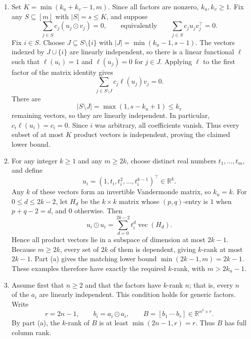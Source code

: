 \documentclass[12pt]{article}
\theoremstyle{plain}
\theoremstyle{definition}
\begin{document}
\newline 
\begin{enumerate}
    \item[(a)] Set \(K=\min(k_u+k_v-1,m)\). Since all factors are
    nonzero, \(k_u,k_v\geq1\). Fix any \(S\subseteq[m]\) with
    \(|S|=s\leq K\), and suppose
    \[
    \sum_{j\in S}c_j(u_j\odot v_j)=0,
    \qquad\text{equivalently}\qquad
    \sum_{j\in S}c_j u_jv_j^\top=0.
    \]
    Fix \(i\in S\). Choose \(J\subseteq S\setminus\{i\}\) with
    \(|J|=\min(k_u-1,s-1)\). The vectors indexed by
    \(J\cup\{i\}\) are linearly independent, so there is a linear
    functional \(\ell\) such that
    \(\ell(u_i)=1\) and \(\ell(u_j)=0\) for \(j\in J\).
    Applying \(\ell\) to the first factor of the matrix identity gives
    \[
    \sum_{j\in S\setminus J}c_j\ell(u_j)v_j=0.
    \]
    There are
    \[
    |S\setminus J|=\max(1,s-k_u+1)\leq k_v
    \]
    remaining vectors, so they are linearly independent. In particular,
    \(c_i\ell(u_i)=c_i=0\). Since \(i\) was arbitrary, all coefficients
    vanish. Thus every subset of at most \(K\) product vectors is
    independent, proving the claimed lower bound.

    \item[(b)] For any integer \(k\geq1\) and any \(m\geq2k\), choose
    distinct real numbers \(t_1,\ldots,t_m\), and define
    \[
    u_i=(1,t_i,t_i^2,\ldots,t_i^{k-1})^\top\in\mathbb R^k.
    \]
    Any \(k\) of these vectors form an invertible Vandermonde matrix,
    so \(k_u=k\). For \(0\leq d\leq2k-2\), let \(H_d\) be the
    \(k\times k\) matrix whose \((p,q)\)-entry is \(1\) when
    \(p+q-2=d\), and \(0\) otherwise. Then
    \[
    u_i\odot u_i
    =\sum_{d=0}^{2k-2}t_i^d\operatorname{vec}(H_d).
    \]
    Hence all product vectors lie in a subspace of dimension at most
    \(2k-1\). Because \(m\geq2k\), every set of \(2k\) of them is
    dependent, giving \(k\)-rank at most \(2k-1\). Part (a) gives the
    matching lower bound \(\min(2k-1,m)=2k-1\). These examples therefore
    have exactly the required \(k\)-rank, with \(m>2k_u-1\).

    \item[(c)] Assume first that \(n\geq2\) and that the factors have
    \(k\)-rank \(n\); that is, every \(n\) of the \(a_i\) are
    linearly independent. This condition holds for generic factors.
    Write
    \[
    r=2n-1,\qquad b_i=a_i\odot a_i,\qquad
    B=[b_1\ \cdots\ b_r]\in\mathbb R^{n^2\times r}.
    \]
    By part (a), the \(k\)-rank of \(B\) is at least
    \(\min(2n-1,r)=r\). Thus \(B\) has full column rank.


\end{enumerate}
\end{document}
